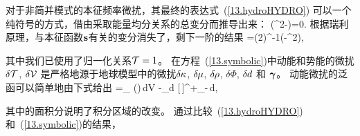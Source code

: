 {{%

对于非简并模式的本征频率微扰，其最终的表达式~(\ref{13.hydroHYDRO})
可以一个纯符号的方式，借由采取能量均分关系的总变分而推导出来：
\eq
\half(\om^2\sT-\sV)=0.
\en
根据瑞利原理，与本征函数$\mbox{${\bf s}$}$有关的变分消失了，剩下一阶的结果
\eq 
\label{13.symbolic}
\delta\om=(2\om)^{-1}(\delta\sV-\om^2\delta\sT),
\en

其中我们已使用了归一化关系$\mbox{$\cal T$}=1$。
在方程~(\ref{13.symbolic})中动能和势能的微扰$\delta\mbox{$\cal T$}$, $\delta\mbox{$\cal V$}$
是严格地源于地球模型中的微扰$\delta\hspace{-0.1 mm}\kappa$, $\delta\hspace{-0.2 mm}\mu$,
$\delta\hspace{-0.2 mm}\rho$, $\delta\Phi$, $\delta\hspace{-0.1 mm}d$
和 $\mbox{\boldmath $\bf \gamma$}$。
动能微扰的泛函可以简单地由下式给出
\eq
\label{13.kinener}
\delta\sT=\int_{\subearth}\delta\hspace{-0.2 mm}
\rho\hspace{0.3 mm}(\bs\cdot\bs)\,dV
-\int_{\Sigma}\delta\hspace{-0.1 mm}d\hspace{0.3 mm}
[\rho\,\bs\cdot\bs]^+_-\,d\/\Sigma,
\en

其中的面积分说明了积分区域的改变。
通过比较~(\ref{13.hydroHYDRO})和~(\ref{13.symbolic})的结果，
}}
